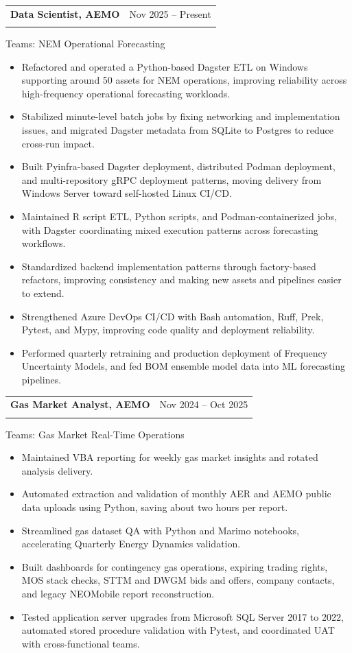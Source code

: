 \documentclass[10pt,a4paper]{article}
\makeatletter
\newenvironment{resumejob}[3]{
  \par\addvspace{0.45em}
  \noindent\begin{tabularx}{\textwidth}{@{}>{\raggedright\arraybackslash}X>{\raggedleft\arraybackslash}p{0.3\textwidth}@{}}
    \textbf{\textcolor{textdark}{#1}} & \textcolor{mutedtext}{#2} \\
    \multicolumn{2}{@{}l@{}}{\textit{\textcolor{mutedtext}{#3}}}
  \end{tabularx}
  \vspace{-0.55em}
}{
  \par\addvspace{0.2em}
}
\makeatother
\begin{document}
\begin{resumejob}{Data Scientist, AEMO}{Nov 2025 -- Present}{Melbourne}
Teams: NEM Operational Forecasting
\begin{itemize}
  \item Refactored and operated a Python-based Dagster ETL on Windows supporting around 50 assets for NEM operations, improving reliability across high-frequency operational forecasting workloads.
  \item Stabilized minute-level batch jobs by fixing networking and implementation issues, and migrated Dagster metadata from SQLite to Postgres to reduce cross-run impact.
  \item Built Pyinfra-based Dagster deployment, distributed Podman deployment, and multi-repository gRPC deployment patterns, moving delivery from Windows Server toward self-hosted Linux CI/CD.
  \item Maintained R script ETL, Python scripts, and Podman-containerized jobs, with Dagster coordinating mixed execution patterns across forecasting workflows.
  \item Standardized backend implementation patterns through factory-based refactors, improving consistency and making new assets and pipelines easier to extend.
  \item Strengthened Azure DevOps CI/CD with Bash automation, Ruff, Prek, Pytest, and Mypy, improving code quality and deployment reliability.
  \item Performed quarterly retraining and production deployment of Frequency Uncertainty Models, and fed BOM ensemble model data into ML forecasting pipelines.
\end{itemize}
\end{resumejob}

\begin{resumejob}{Gas Market Analyst, AEMO}{Nov 2024 -- Oct 2025}{Melbourne}
Teams: Gas Market Real-Time Operations
\begin{itemize}
  \item Maintained VBA reporting for weekly gas market insights and rotated analysis delivery.
  \item Automated extraction and validation of monthly AER and AEMO public data uploads using Python, saving about two hours per report.
  \item Streamlined gas dataset QA with Python and Marimo notebooks, accelerating Quarterly Energy Dynamics validation.
  \item Built dashboards for contingency gas operations, expiring trading rights, MOS stack checks, STTM and DWGM bids and offers, company contacts, and legacy NEOMobile report reconstruction.
  \item Tested application server upgrades from Microsoft SQL Server 2017 to 2022, automated stored procedure validation with Pytest, and coordinated UAT with cross-functional teams.
\end{itemize}
\end{resumejob}
\end{document}
